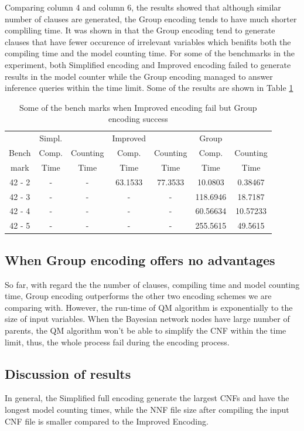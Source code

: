 Comparing column 4 and column 6, the results showed that although similar number of clauses are generated, the Group encoding tends to have much shorter compliling time. It was shown in \cite{2006-enc3} that the Group encoding tend to generate clauses that have fewer occurence of irrelevant variables which benifits both the compiling time and the model counting time. For some of the benchmarks in the experiment, both Simplified encoding and Improved encoding failed to generate results in the model counter while the Group encoding managed to answer inference queries within the time limit. Some of the results are shown in Table \ref{tab:good Group encoding}\\
\begin{table}[]
\centering
\begin{tabular}{c|c c | c c | c c}
    \hline
    	&	Simpl.	&		&	Improved	&		&	Group	&		\\
    
	Bench		&	Comp. 	&	Counting 	&	Comp. 	&	Counting 	&	Comp. 	&	Counting 	\\
mark	&	Time	&	Time	&	Time	&	Time	&	Time	&	Time	\\
	\hline
	\hline
    42	-	2	&	-	&	-	& 63.1533 &	77.3533	&	10.0803	&	0.38467	\\
    42	-	3	&	-	&	-	&	-	&	-	&	118.6946	&	18.7187	\\
    42	-	4	&	-	&	-	&	-	&	-	&	60.56634	&	10.57233	\\
    42	-	5	&	-	&	-	&	-	&	-	&	255.5615	&	49.5615	\\
    \hline
\end{tabular}
\caption{Some of the bench marks when Improved encoding fail but Group encoding success}
    \label{tab:good Group encoding}
\end{table}

\subsection{When Group encoding offers no advantages}
So far, with regard the the number of clauses, compiling time and model counting time, Group encoding outperforms the other two encoding schemes we are comparing with. However, the run-time of QM algorithm is exponentially to the size of input variables. When the Bayesian network nodes have large number of parents, the QM algorithm won't be able to simplify the CNF within the time limit, thus, the whole process fail during the encoding process.

\subsection{Discussion of results}
In general, the Simplified full encoding generate the largest CNFs and have the longest model counting times, while the NNF file size after compiling the input CNF file is smaller compared to the Improved Encoding.\\

